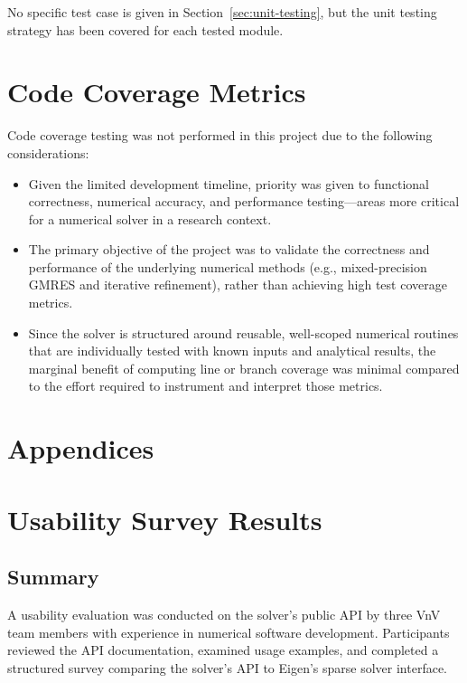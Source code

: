\documentclass[12pt, titlepage]{article}
\begin{document}
No specific test case is given in Section~\ref{sec:unit-testing}, but the unit
testing strategy has been covered for each tested module.

\section{Code Coverage Metrics}

Code coverage testing was not performed in this project due to the following
considerations:

\begin{itemize}
\item Given the limited development timeline, priority was given to functional
  correctness, numerical accuracy, and performance testing—areas more critical
  for a numerical solver in a research context.
\item The primary objective of the project was to validate the correctness and
  performance of the underlying numerical methods (e.g., mixed-precision GMRES
  and iterative refinement), rather than achieving high test coverage metrics.
\item Since the solver is structured around reusable, well-scoped numerical
  routines that are individually tested with known inputs and analytical
  results, the marginal benefit of computing line or branch coverage was minimal
  compared to the effort required to instrument and interpret those metrics.
\end{itemize}
\newpage{}

\printbibliography{}

\newpage{}

\appendix{}
\section*{Appendices}

\section{Usability Survey Results}
\label{sec:usab-surv-results}

\subsection{Summary}

A usability evaluation was conducted on the solver’s public API by three VnV
team members with experience in numerical software development. Participants
reviewed the API documentation, examined usage examples, and completed a
structured survey comparing the solver's API to Eigen's sparse solver interface.
\end{document}
